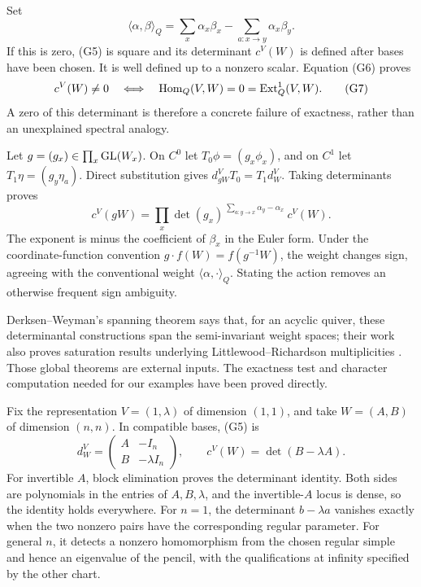 Set
\[
 \langle\alpha,\beta\rangle_Q
  =\sum_x\alpha_x\beta_x-\sum_{a:x\to y}\alpha_x\beta_y.
\]
If this is zero, (G5) is square and its determinant \(c^V(W)\) is defined after bases have been chosen. It is well defined up to a nonzero scalar. Equation (G6) proves
\[
 c^V(W)\ne0\quad\Longleftrightarrow\quad
 \operatorname{Hom}_Q(V,W)=0=\operatorname{Ext}^1_Q(V,W).
 \tag{G7}
\]
A zero of this determinant is therefore a concrete failure of exactness, rather than an unexplained spectral analogy.

Let \(g=(g_x)\in\prod_x\operatorname{GL}(W_x)\). On \(C^0\) let \(T_0\phi=(g_x\phi_x)\), and on \(C^1\) let \(T_1\eta=(g_y\eta_a)\). Direct substitution gives
\(d_{gW}^VT_0=T_1d_W^V\). Taking determinants proves
\[
 c^V(gW)=
 \prod_x\det(g_x)^{\,\sum_{a:y\to x}\alpha_y-\alpha_x}\ c^V(W).
 \tag{G8}\label{eq:schofield-weight}
\]
The exponent is minus the coefficient of \(\beta_x\) in the Euler form. Under the coordinate-function convention \(g\cdot f(W)=f(g^{-1}W)\), the weight changes sign, agreeing with the conventional weight \(\langle\alpha,\cdot\rangle_Q\). Stating the action removes an otherwise frequent sign ambiguity.

Derksen--Weyman's spanning theorem says that, for an acyclic quiver, these determinantal constructions span the semi-invariant weight spaces; their work also proves saturation results underlying Littlewood--Richardson multiplicities \citep{GIDerksenWeyman2000}. Those global theorems are external inputs. The exactness test and character computation needed for our examples have been proved directly.

\begin{example}
Fix the representation \(V=(1,\lambda)\) of dimension \((1,1)\), and take \(W=(A,B)\) of dimension \((n,n)\). In compatible bases, (G5) is
\[
 d_W^V=\begin{pmatrix}A&-I_n\\B&-\lambda I_n\end{pmatrix},
 \qquad c^V(W)=\det(B-\lambda A).
 \tag{G9}
\]
For invertible \(A\), block elimination proves the determinant identity. Both sides are polynomials in the entries of \(A,B,\lambda\), and the invertible-\(A\) locus is dense, so the identity holds everywhere. For \(n=1\), the determinant \(b-\lambda a\) vanishes exactly when the two nonzero pairs have the corresponding regular parameter. For general \(n\), it detects a nonzero homomorphism from the chosen regular simple and hence an eigenvalue of the pencil, with the qualifications at infinity specified by the other chart.
\end{example}

